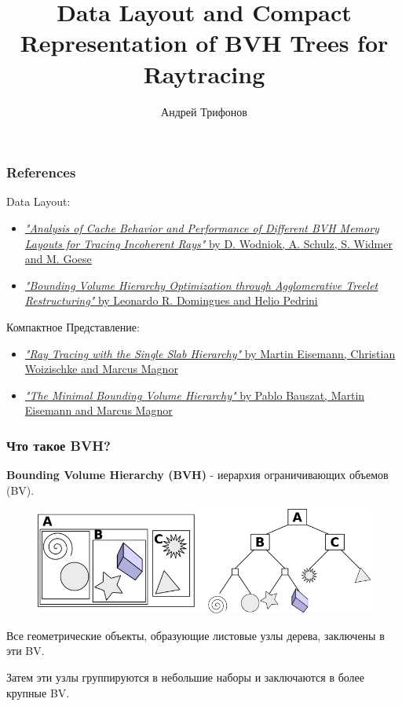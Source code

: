 \documentclass{beamer}
\title{Data Layout and Compact Representation of BVH Trees for Raytracing}
\author{Андрей Трифонов}
\begin{document}
\maketitle

\begin{frame}
    \frametitle{References}
    Data Layout:
    \begin{itemize}
        \item
            \href{https://diglib.eg.org/bitstream/handle/10.2312/EGPGV.EGPGV13.057-064/057-064.pdf?sequence=1}
            {\textit{"Analysis of Cache Behavior and Performance of Different BVH Memory
            Layouts for Tracing Incoherent Rays"} by D. Wodniok, A. Schulz, S. Widmer and M. Goese}
        \item
            \href{https://sci-hub.ru/http://dx.doi.org/10.1145/2790060.2790065}
            {\textit{"Bounding Volume Hierarchy Optimization through Agglomerative Treelet Restructuring"}
            by Leonardo R. Domingues and Helio Pedrini}
    \end{itemize}
    Компактное Представление:
    \begin{itemize}
        \item
            \href{https://woizischke.com/ray-tracing-single-slab-hierarchy.pdf}
            {\textit{"Ray Tracing with the Single Slab Hierarchy"}
            by Martin Eisemann, Christian Woizischke and Marcus Magnor}
        \item
            \href{https://diglib.eg.org/bitstream/handle/10.2312/PE.VMV.VMV10.227-234/227-234.pdf}
            {\textit{"The Minimal Bounding Volume Hierarchy"}
            by Pablo Bauszat, Martin Eisemann and Marcus Magnor}
    \end{itemize}
\end{frame}

\begin{frame}
    \frametitle{Что такое BVH?}
    \begin{block}{}
    \textbf{Bounding Volume Hierarchy (BVH)} - иерархия ограничивающих объемов (BV).
    \end{block}
    \begin{figure}
    \includegraphics[keepaspectratio, width=\textwidth]{res/bvh.png}
    \end{figure}
    Все геометрические объекты, образующие листовые узлы дерева, заключены в эти BV.

    Затем эти узлы группируются в небольшие наборы и заключаются в более крупные BV.

\end{frame}
\end{document}
